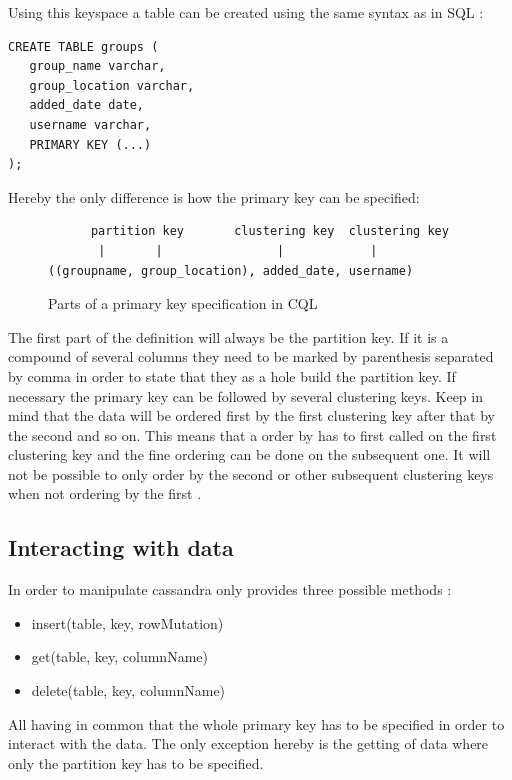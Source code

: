 Using this keyspace a table can be created using the same syntax as in SQL \autocite{cqlAlexMeng, newInCQL3, cassandra3cqldocCreateTable}:
\begin{verbatim}
CREATE TABLE groups (
   group_name varchar,
   group_location varchar,
   added_date date,
   username varchar,
   PRIMARY KEY (...)
);
\end{verbatim}

Hereby the only difference is how the primary key can be specified:
\begin{figure}[ht]
    \centering
\begin{verbatim}
      partition key       clustering key  clustering key
       |       |                |            |
((groupname, group_location), added_date, username)
\end{verbatim}
    \caption{Parts of a primary key specification in CQL \autocite{cqlPrimaryKeyDefinition}}
    \label{fig:cassandra:primaryKeyDefinition}
\end{figure}
The first part of the definition will always be the partition key. If it is a compound of several columns they need to be marked by parenthesis separated by comma in order to state that they as a hole build the partition key. If necessary the primary key can be followed by several clustering keys. Keep in mind that the data will be ordered first by the first clustering key after that by the second and so on. This means that a order by has to first called on the first clustering key and the fine ordering can be done on the subsequent one. It will not be possible to only order by the second or other subsequent clustering keys when not ordering by the first \autocite{cqlPrimaryKeyDefinition, cassandra3cqldocCreateTable}.

\subsection{Interacting with data}
In order to manipulate cassandra only provides three possible methods \autocite{cassandra_paper}:
\begin{itemize}
    \item insert(table, key, rowMutation)
    \item get(table, key, columnName)
    \item delete(table, key, columnName)
\end{itemize}
All having in common that the whole primary key has to be specified in order to interact with the data. The only exception hereby is the getting of data where only the partition key has to be specified.


